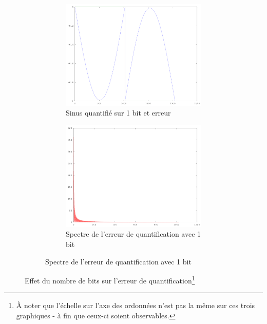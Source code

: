 \documentclass{article}
\begin{document}
\begin{figure}[h!]
	\\
	\begin{subfigure}[b]{\textwidth}
		\begin{subfigure}[b]{.45\textwidth}
			\centering
			\includegraphics[width=\textwidth]{err_quantif_1bit_t}
			\caption{Sinus quantifié sur 1 bit et erreur}
			\label{fig:q_1a}
		\end{subfigure}
		\hfill
		\begin{subfigure}[b]{.45\textwidth}
			\centering
			\includegraphics[width=\textwidth]{err_quantif_1bit_f}
			\caption{Spectre de l'erreur de quantification avec 1 bit}
			\label{fig:q_1b}
		\end{subfigure}
	\end{subfigure}	
	\caption{Effet du nombre de bits sur l'erreur de quantification\footnote{À noter que l'échelle sur l'axe des ordonnées n'est pas la même sur ces trois graphiques - à fin que ceux-ci soient observables.}}
\end{figure}
\end{document}

